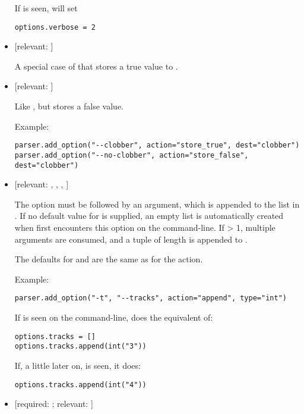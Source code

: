 \begin{itemize}
If  is seen,  will set
\begin{verbatim}
options.verbose = 2
\end{verbatim}

\item {} 
 {[}relevant: ]

A special case of  that stores a true value
to .

\item {} 
 {[}relevant: ]

Like , but stores a false value.

Example:
\begin{verbatim}
parser.add_option("--clobber", action="store_true", dest="clobber")
parser.add_option("--no-clobber", action="store_false", dest="clobber")
\end{verbatim}

\item {} 
 {[}relevant: , , , ]

The option must be followed by an argument, which is appended to the
list in .  If no default value for  is supplied, an
empty list is automatically created when  first encounters this
option on the command-line.  If  {\textgreater} 1, multiple arguments are
consumed, and a tuple of length  is appended to .

The defaults for  and  are the same as for the
 action.

Example:
\begin{verbatim}
parser.add_option("-t", "--tracks", action="append", type="int")
\end{verbatim}

If  is seen on the command-line,  does the equivalent of:
\begin{verbatim}
options.tracks = []
options.tracks.append(int("3"))
\end{verbatim}

If, a little later on,  is seen, it does:
\begin{verbatim}
options.tracks.append(int("4"))
\end{verbatim}

\item {} 
 {[}required: ; relevant: ]


\end{itemize}
